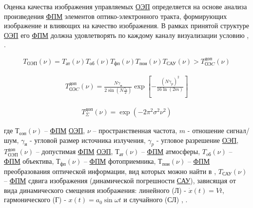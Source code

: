 Оценка качества изображения управляемых \hyperref[acroEOS]{ОЭП} определяется на основе анализа произведения \hyperref[acroFPM]{ФПМ} элементов оптико-электронного тракта, формирующих изображение и влияющих на качество изображения. В рамках принятой структуре \hyperref[acroEOS]{ОЭП} его \hyperref[acroFPM]{ФПМ} должна удовлетворять по каждому каналу визуализации условию \cite[]{Ivanov18}, \cite[]{Molin21}.

\begin{equation}
\label{eq:p2:2.5}
\begin{alignedat}{2}
T_{\textit{ОЭП}}( \nu )=
T_{\textit{ат}}(\nu)T_{\textit{об}}(\nu)T_{\textit{фп}}(\nu)T_{\textit{пои}}(\nu)T_{\textit{САУ}}(\nu)>
T_{\textit{ОЭC}}^{\textit{доп}}(\nu)
\end{alignedat}
\end{equation}

\begin{equation}
\label{eq:p2:3}
\begin{alignedat}{2}
T_{\textit{ОЭC}}^{\textit{доп}}\left(\nu{}\right)=
\frac{N{\gamma{}}_\textit{и}}{2\sin{\left(N\frac{{\gamma{}}_\textit{и}}{2}\right)}}
\exp{\left[-\frac{{\left(N{\gamma{}}_p\right)}^2}{16\ln{\left(2m\right)}}\right]}
\end{alignedat}
\end{equation}

\begin{equation}
\label{eq:p2:4}
\begin{alignedat}{2}
T_{\Sigma{}}^{\textit{доп}}\left(\nu\right)=\exp{\left(-2{\pi{}}^2{\sigma{}}^2\nu^2\right)}
\end{alignedat}
\end{equation}

где 
$Т_{\textit{оэп}}(\nu)$ – \hyperref[acroFPM]{ФПМ} \hyperref[acroEOS]{ОЭП}, 
$\nu$ – пространственная частота, 
$m$ - отношение сигнал/шум, 
$\gamma_\textit{и}$ - угловой размер источника излучения, 
$\gamma_\textit{p}$ - угловое разрешение \hyperref[acroEOS]{ОЭП}, 
$T_{\textit{ОЭП}}^{\textit{доп}}(\nu)$ – допустимая \hyperref[acroFPM]{ФПМ} \hyperref[acroEOS]{ОЭП}, 
$Т_\textit{ат}(\nu)$ – \hyperref[acroFPM]{ФПМ} атмосферы, 
$T_\textit{oб}(\nu)$ – \hyperref[acroFPM]{ФПМ} объектива, 
$Т_\textit{фп}(\nu)$ – \hyperref[acroFPM]{ФПМ} фотоприемника, 
$Т_\textit{пои}(\nu)$ – \hyperref[acroFPM]{ФПМ} преобразования оптической информации, вид которых можно найти в \cite[]{Tarasov}, 
$T_{\textit{САУ}}(\nu)$ – \hyperref[acroFPM]{ФПМ} сдвига изображения (динамической погрешности \hyperref[acroSAU]{САУ}), зависящая от вида динамического смещения изображения: линейного (Л) - $\dot{x}(t) = Vt$, 
гармонического (Г) - $x(t)=a_{0}\sin{\omega t}$ и 
случайного (СЛ) \cite[]{Tarasov}, \cite[]{Sokolski22}.

